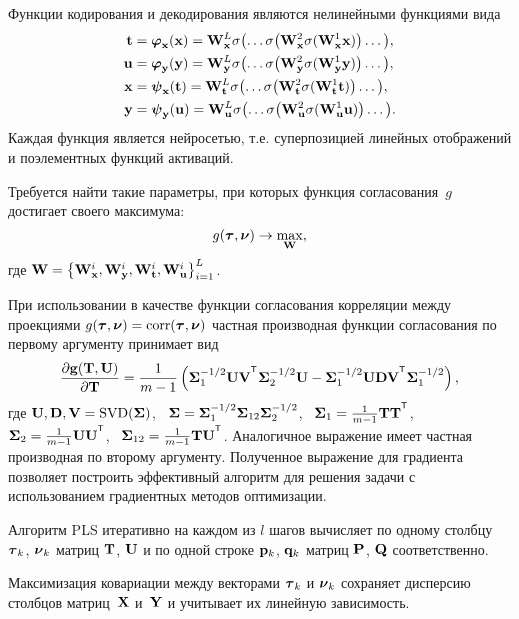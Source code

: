 \documentclass[11pt, a5paper]{dissert}
\begin{document}
Функции кодирования и декодирования являются нелинейными функциями вида
\begin{align*}
	\mathbf{t} &= \boldsymbol{\varphi}_{\mathbf{x}}(\mathbf{x}) =  \mathbf{W}_{\mathbf{x}}^L \sigma \bigl(\dots \sigma \bigl(\mathbf{W}_{\mathbf{x}}^2 \sigma(\mathbf{W}_{\mathbf{x}}^1 \mathbf{x}) \bigr) \dots \bigr), \\
	\mathbf{u} &= \boldsymbol{\varphi}_{\mathbf{y}}(\mathbf{y}) =  \mathbf{W}_{\mathbf{y}}^L \sigma \bigl(\dots \sigma \bigl(\mathbf{W}_{\mathbf{y}}^2 \sigma(\mathbf{W}_{\mathbf{y}}^1 \mathbf{y}) \bigr) \dots \bigr), \\
	\mathbf{x} &= \boldsymbol{\psi}_{\mathbf{x}}(\mathbf{t}) =  \mathbf{W}_{\mathbf{t}}^L \sigma \bigl(\dots \sigma \bigl(\mathbf{W}_{\mathbf{t}}^2 \sigma(\mathbf{W}_{\mathbf{t}}^1 \mathbf{t} ) \bigr) \dots \bigr), \\
	\mathbf{y} &= \boldsymbol{\psi}_{\mathbf{y}}(\mathbf{u}) =  \mathbf{W}_{\mathbf{u}}^L \sigma \bigl(\dots \sigma \bigl(\mathbf{W}_{\mathbf{u}}^2 \sigma(\mathbf{W}_{\mathbf{u}}^1 \mathbf{u} ) \bigr) \dots \bigr).
\end{align*}
Каждая функция является нейросетью, т.е. суперпозицией линейных отображений и поэлементных функций активаций.

Требуется найти такие параметры, при которых функция согласования~$g$ достигает своего максимума:
\begin{equation}
	g(\boldsymbol{\tau}, \boldsymbol{\nu}) \rightarrow \max_{\mathbf{W}},
	\label{ch2:eq:concordance}
\end{equation}
где $\mathbf{W} = \bigl\{\mathbf{W}_{\mathbf{x}}^i, \mathbf{W}_{\mathbf{y}}^i, \mathbf{W}_{\mathbf{t}}^i, \mathbf{W}_{\mathbf{u}}^i\bigr\}_{i=1}^L$.

При использовании в качестве функции согласования корреляции между проекциями $g(\boldsymbol{\tau}, \boldsymbol{\nu}) = \textnormal{corr}(\boldsymbol{\tau}, \boldsymbol{\nu})$ частная производная функции согласования по первому аргументу принимает вид
\[
	\frac{\partial \mathbf{g}(\bT, \bU)}{\partial \bT} = \frac{1}{m - 1} \left(\bSigma_1^{-1/2} \bU \bV^{\T} \bSigma_2^{-1/2} \bU - \bSigma_1^{-1/2} \bU \bD \bV^{\T} \bSigma_1^{-1/2} \right),
\]
где $\mathbf{U}, \mathbf{D}, \mathbf{V} = \textnormal{SVD}(\boldsymbol{\Sigma})$, \, $\boldsymbol{\Sigma} = \boldsymbol{\Sigma}_1^{-1/2} \boldsymbol{\Sigma}_{12} \boldsymbol{\Sigma}_2^{-1/2} $, \, $\bSigma_1 = \frac{1}{m - 1} \bT \bT^{\T}$, \, $\bSigma_2 = \frac{1}{m - 1} \bU \bU^{\T}$, \, $\bSigma_{12} = \frac{1}{m - 1} \bT \bU^{\T}$.
Аналогичное выражение имеет частная производная по второму аргументу.
Полученное выражение для градиента позволяет построить эффективный алгоритм для решения задачи с использованием градиентных методов оптимизации.

Алгоритм PLS итеративно на каждом из $l$ шагов вычисляет по одному столбцу $\boldsymbol{\tau}_k$, $\boldsymbol{\nu}_k$ матриц $\mathbf{T}$, $\mathbf{U}$ и по одной строке $\mathbf{p}_k$, $\mathbf{q}_k$ матриц $\mathbf{P}$, $\mathbf{Q}$ соответственно. 

\begin{statement}
	Максимизация ковариации между векторами $\boldsymbol{\tau}_k$ и $\boldsymbol{\nu}_k$ сохраняет дисперсию столбцов матриц~$\mathbf{X}$ и~$\mathbf{Y}$ и учитывает их линейную зависимость.
\end{statement}
\end{document}
